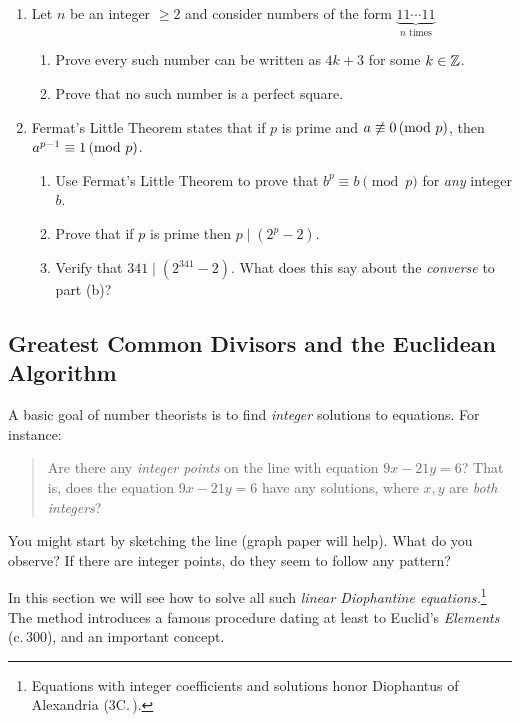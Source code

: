 \begin{exercises}{}{}
\begin{enumerate}
	    
	  \item Let $n$ be an integer $\ge 2$ and consider numbers of the form $\underbrace{11\cdots 11}_{n \text{ times}}$
	  \begin{enumerate}
	    \item Prove every such number can be written as $4k+3$ for some $k\in\mathbb{Z}$.
	    \item Prove that no such number is a perfect square.
	  \end{enumerate}
		
	    
	  \item Fermat's Little Theorem states that if $p$ is prime and $a\not\equiv 0\negthickspace\pmod{p}$, then $a^{p-1}\equiv 1\negthickspace\pmod{p}$.
		\begin{enumerate}
		  \item Use Fermat's Little Theorem to prove that $b^p\equiv b\pmod p$ for \emph{any} integer $b$.
		  \item Prove that if $p$ is prime then $p\mid(2^p-2)$.
		  \item Verify that $341\mid (2^{341}-2)$. What does this say about the \emph{converse} to part (b)?
		\end{enumerate}
	  
	\end{enumerate}

\end{exercises}

\clearpage


\subsection{Greatest Common Divisors and the Euclidean Algorithm}\label{sec:gcd}

A basic goal of number theorists is to find \emph{integer} solutions to equations. For instance:
\begin{quote}
	Are there any \emph{integer points} on the line with equation $9x-21y=6$? That is, does the equation $9x-21y=6$ have any solutions, where $x,y$ are \emph{both integers}?
\end{quote}

You might start by sketching the line (graph paper will help). What do you observe? If there are integer points, do they seem to follow any pattern?\smallbreak

In this section we will see how to solve all such \emph{linear Diophantine equations.}\footnote{Equations with integer coefficients and solutions honor Diophantus of Alexandria (3\rd{}C.\,\CE).} The method introduces a famous procedure dating at least to Euclid's \emph{Elements} (c.\,300\BCE), and an important concept.


